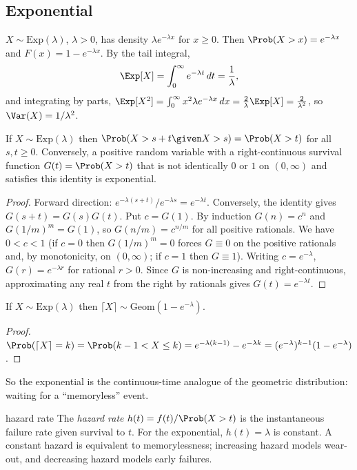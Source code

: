 \subsection{Exponential}

$X\sim\mathrm{Exp}(\lambda)$, $\lambda>0$, has density $\lambda e^{-\lambda x}$ for
$x\ge0$. Then $\Prob(X>x)=e^{-\lambda x}$ and $F(x)=1-e^{-\lambda x}$. By the tail
integral,
\[
\Exp[X]=\int_0^\infty e^{-\lambda t}\,dt=\frac1\lambda,
\]
and integrating by parts, $\Exp[X^2]=\int_0^\infty x^2\lambda e^{-\lambda x}\,dx
=\frac2\lambda\Exp[X]=\frac2{\lambda^2}$, so $\Var(X)=1/\lambda^2$.

\begin{theorem}\label{thm:expmemoryless}
If $X\sim\mathrm{Exp}(\lambda)$ then $\Prob(X>s+t\given X>s)=\Prob(X>t)$ for all
$s,t\ge0$. Conversely, a positive random variable with a right-continuous
survival function $G(t)=\Prob(X>t)$ that is not identically $0$ or $1$ on
$(0,\infty)$ and satisfies this identity is exponential.
\end{theorem}
\begin{proof}
Forward direction: $e^{-\lambda(s+t)}/e^{-\lambda s}=e^{-\lambda t}$.
Conversely, the identity gives $G(s+t)=G(s)G(t)$. Put $c=G(1)$. By induction
$G(n)=c^n$ and $G(1/m)^m=G(1)$, so $G(n/m)=c^{n/m}$ for all positive rationals. We
have $0<c<1$ (if $c=0$ then $G(1/m)^m=0$ forces $G\equiv0$ on the positive
rationals and, by monotonicity, on $(0,\infty)$; if $c=1$ then $G\equiv1$).
Writing $c=e^{-\lambda}$, $G(r)=e^{-\lambda r}$ for rational $r>0$. Since $G$ is
non-increasing and right-continuous, approximating any real $t$ from the right
by rationals gives $G(t)=e^{-\lambda t}$.
\end{proof}

\begin{proposition}
If $X\sim\mathrm{Exp}(\lambda)$ then $\lceil X\rceil\sim\mathrm{Geom}(1-e^{-\lambda})$.
\end{proposition}
\begin{proof}
$\Prob(\lceil X\rceil=k)=\Prob(k-1<X\le k)=e^{-\lambda(k-1)}-e^{-\lambda k}=
(e^{-\lambda})^{k-1}(1-e^{-\lambda})$.
\end{proof}

So the exponential is the continuous-time analogue of the geometric distribution:
waiting for a ``memoryless'' event.

\begin{interview}{hazard rate}
The \emph{hazard rate} $h(t)=f(t)/\Prob(X>t)$ is the instantaneous failure rate
given survival to $t$. For the exponential, $h(t)=\lambda$ is constant. A constant
hazard is equivalent to memorylessness; increasing hazard models wear-out, and
decreasing hazard models early failures.
\end{interview}

